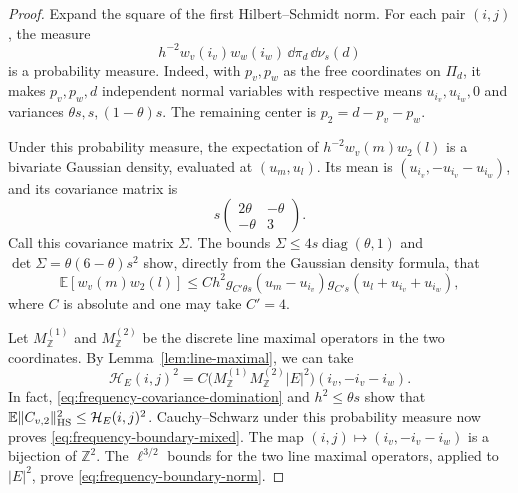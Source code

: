 \begin{proof}
Expand the square of the first Hilbert--Schmidt norm.  For each pair
$(i,j)$, the measure
\[
 h^{-2}w_v(i_v)w_w(i_w)\,\dd\pi_d\,\dd\nu_s(d)
\]
is a probability measure.  Indeed, with $p_v,p_w$ as the free
coordinates on $\Pi_d$, it makes $p_v,p_w,d$ independent normal
variables with respective means $u_{i_v},u_{i_w},0$ and variances
$\theta s,s,(1-\theta)s$.  The remaining center is
$p_2=d-p_v-p_w$.

Under this probability measure, the expectation of
$h^{-2}w_v(m)w_2(l)$ is a bivariate Gaussian density, evaluated at
$(u_m,u_l)$.  Its mean is
$(u_{i_v},-u_{i_v}-u_{i_w})$, and its covariance matrix is
\[
 s\begin{pmatrix}2\theta&-\theta\\-\theta&3\end{pmatrix}.
\]
Call this covariance matrix $\Sigma$.  The bounds
$\Sigma\leq4s\operatorname{diag}(\theta,1)$ and
$\det\Sigma=\theta(6-\theta)s^2$ show, directly from the Gaussian
density formula, that
\begin{equation}\label{eq:frequency-covariance-domination}
 \mathbb E[w_v(m)w_2(l)]
 \leq Ch^2g_{C'\theta s}(u_m-u_{i_v})
                g_{C's}(u_l+u_{i_v}+u_{i_w}),
\end{equation}
where $C$ is absolute and one may take $C'=4$.

Let $M_{\mathbb Z}^{(1)}$ and $M_{\mathbb Z}^{(2)}$ be the discrete
line maximal operators in the two coordinates.  By
Lemma~\ref{lem:line-maximal}, we can take
\begin{equation}\label{eq:frequency-boundary-majorant}
 \mathcal H_E(i,j)^2
 =C\bigl(M_{\mathbb Z}^{(1)}M_{\mathbb Z}^{(2)}|E|^2\bigr)
                 (i_v,-i_v-i_w).
\end{equation}
In fact, \eqref{eq:frequency-covariance-domination} and
$h^2\leq\theta s$ show that
$\mathbb E\|C_{v,2}\|_{\mathrm{HS}}^2\leq\mathcal H_E(i,j)^2$.
Cauchy--Schwarz under this probability measure now proves
\eqref{eq:frequency-boundary-mixed}.  The map
$(i,j)\mapsto(i_v,-i_v-i_w)$ is a bijection of $\mathbb Z^2$.
The $\ell^{3/2}$ bounds for the two line maximal operators, applied
to $|E|^2$, prove \eqref{eq:frequency-boundary-norm}.
\end{proof}

